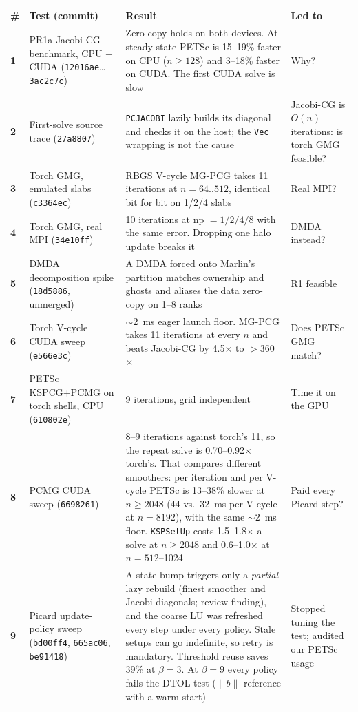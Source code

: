 \documentclass[11pt]{article}
\begin{document}
\begin{longtable}{>{\bfseries}p{} p{} p{} p{}}
\toprule
\# & Test (commit) & Result & Led to \\
\midrule
\endhead
1 & PR1a Jacobi-CG benchmark, CPU + CUDA (\texttt{12016ae}\ldots\texttt{3ac2c7c}) & Zero-copy holds on both devices. At steady state PETSc is 15--19\% faster on CPU ($n\ge128$) and 3--18\% faster on CUDA. The first CUDA solve is slow & Why? \\
2 & First-solve source trace (\texttt{27a8807}) & \texttt{PCJACOBI} lazily builds its diagonal and checks it on the host; the \texttt{Vec} wrapping is not the cause & Jacobi-CG is $O(n)$ iterations: is torch GMG feasible? \\
3 & Torch GMG, emulated slabs (\texttt{c3364ec}) & RBGS V-cycle MG-PCG takes 11 iterations at $n=64..512$, identical bit for bit on 1/2/4 slabs & Real MPI? \\
4 & Torch GMG, real MPI (\texttt{34e10ff}) & 10 iterations at np $=1/2/4/8$ with the same error. Dropping one halo update breaks it & DMDA instead? \\
5 & DMDA decomposition spike (\texttt{18d5886}, unmerged) & A DMDA forced onto Marlin's partition matches ownership and ghosts and aliases the data zero-copy on 1--8 ranks & R1 feasible \\
6 & Torch V-cycle CUDA sweep (\texttt{e566e3c}) & $\sim$2~ms eager launch floor. MG-PCG takes 11 iterations at every $n$ and beats Jacobi-CG by 4.5$\times$ to $>$360$\times$ & Does PETSc GMG match? \\
7 & PETSc KSPCG+PCMG on torch shells, CPU (\texttt{610802e}) & 9 iterations, grid independent & Time it on the GPU \\
8 & PCMG CUDA sweep (\texttt{6698261}) & 8--9 iterations against torch's 11, so the repeat solve is 0.70--0.92$\times$ torch's. That compares different smoothers: per iteration and per V-cycle PETSc is 13--38\% slower at $n\ge2048$ (44 vs.\ 32~ms per V-cycle at $n=8192$), with the same $\sim$2~ms floor. \texttt{KSPSetUp} costs 1.5--1.8$\times$ a solve at $n\ge2048$ and 0.6--1.0$\times$ at $n=512$--1024 & Paid every Picard step? \\
9 & Picard update-policy sweep (\texttt{bd00ff4}, \texttt{665ac06}, \texttt{be91418}) & A state bump triggers only a \emph{partial} lazy rebuild (finest smoother and Jacobi diagonals; review finding), and the coarse LU was refreshed every step under every policy. Stale setups can go indefinite, so retry is mandatory. Threshold reuse saves 39\% at $\beta=3$. At $\beta=9$ every policy fails the DTOL test ($\|b\|$ reference with a warm start) & Stopped tuning the test; audited our PETSc usage \\

\end{longtable}
\end{document}
